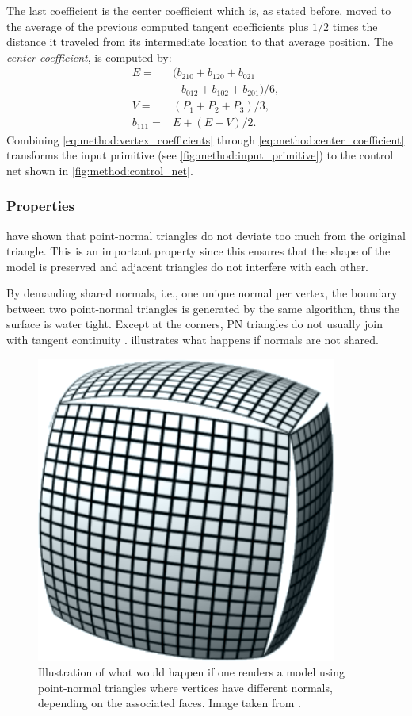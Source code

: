 The last coefficient is the center coefficient which is, as stated before, moved to the average of the previous computed tangent coefficients plus $1/2$ times the distance it traveled from its intermediate location to that average position. The \textit{center coefficient}, is computed by:
\begin{align}\label{eq:method:center_coefficient}
	E = {}& (b_{210} + b_{120} + b_{021} \nonumber \\
		{}& + b_{012} + b_{102} + b_{201}) / 6, \nonumber\\
	V = {}& (P_1 + P_2 + P_3) / 3, \\
	b_{111} = {}& E + (E - V) / 2. \nonumber
\end{align}
Combining \eqref{eq:method:vertex_coefficients} through \eqref{eq:method:center_coefficient} transforms the input primitive (see \cref{fig:method:input_primitive}) to the control net shown in \cref{fig:method:control_net}.


\subsubsection{Properties}
\label{sss:method:geometric:properties}
\citeauthor{vlachos2001curved} have shown that point-normal triangles do not deviate too much from the original triangle. This is an important property since this ensures that the shape of the model is preserved and adjacent triangles do not interfere with each other. 

By demanding shared normals, i.e., one unique normal per vertex, the boundary between two point-normal triangles is generated by the same algorithm, thus the surface is water tight. Except at the corners, PN triangles do not usually join with tangent continuity \cite{vlachos2001curved}.  illustrates what happens if normals are not shared.

\begin{figure}
	\centering
	\includegraphics[width=0.4\columnwidth]{./content/img/method/cracks.png}
	\caption{Illustration of what would happen if one renders a model using point-normal triangles where vertices have different normals, depending on the associated faces. Image taken from \cite{mcdonald2010crack}.}
	\label{fig:method:cracks}
\end{figure}